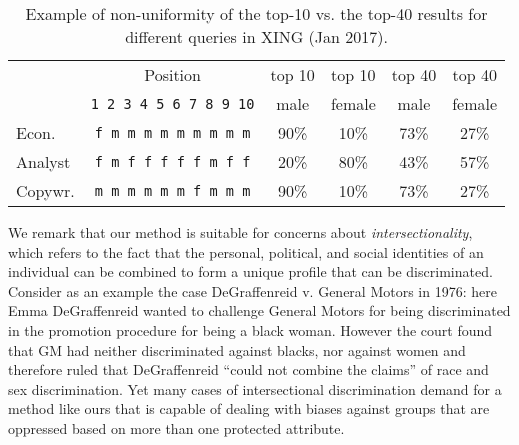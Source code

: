 \begin{table}[t]
	\caption{Example of non-uniformity of the top-10 vs. the top-40 results for different queries in XING (Jan 2017).
		\label{tbl:xing_intro_example}}

	\centering\small\begin{tabular}{lccccc}\toprule
		& Position					  & top 10 & top 10  & top 40 & top 40 \\
		& \texttt{1 2 3 4 5 6 7 8 9 10} & male & female & male & female \\
		\midrule
		Econ.  & \texttt{f m m m m m m m m m} & 90\% & 10\% & 73\% & 27\% \\
		Analyst& \texttt{f m f f f f f m f f} & 20\% & 80\% & 43\% & 57\% \\
		Copywr.& \texttt{m m m m m m f m m m} & 90\% & 10\% & 73\% & 27\% \\
		\bottomrule
	\end{tabular}


\end{table}
%
We remark that our method is suitable for concerns about \emph{intersectionality}, which refers to the fact that \textcolor[rgb]{0.00,0.00,1.00}{the personal}, political, and social identities \textcolor[rgb]{0.00,0.00,1.00}{of an individual can be combined to form a unique profile that can be discriminated}.
%
Consider as an example the case DeGraffenreid v. General Motors in 1976: here Emma DeGraffenreid wanted to challenge General Motors for being discriminated in the promotion procedure for being a black woman.
%
However the court found that GM had neither discriminated against blacks, nor against women and therefore ruled that DeGraffenreid ``could not combine the claims'' of race and sex discrimination.
%
Yet many cases of intersectional discrimination demand for a method like ours that is capable of dealing with biases against groups that are oppressed based on more than one protected \textcolor[rgb]{0.00,0.00,1.00}{attribute}.

